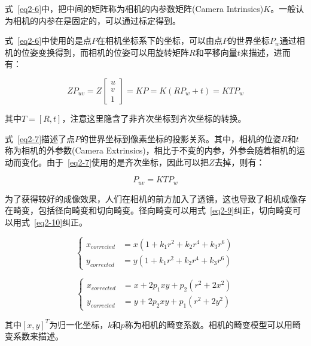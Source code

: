 式~\eqref{eq2-6}中，把中间的矩阵称为相机的内参数矩阵(Camera Intrinsics)$K$。一般认为相机的内参在是固定的，可以通过标定得到。

式~\eqref{eq2-6}中使用的是点$P$在相机坐标系下的坐标，可以由点$P$的世界坐标$P_w$通过相机的位姿变换得到，而相机的位姿可以用旋转矩阵$R$和平移向量$t$来描述，进而有：

\begin{equation}\label{eq2-7}
	Z P_{uv} = Z \left[\begin{array}{c}u \\ v \\ 1\end{array}\right] = K P = K \left(R P_w + t\right) = K T P_w
\end{equation}

其中$T=[R,t]$，注意这里隐含了非齐次坐标到齐次坐标的转换。

式~\eqref{eq2-7}描述了点$P$的世界坐标到像素坐标的投影关系。其中，相机的位姿$R$和$t$称为相机的外参数(Camera Extrinsics)，相比于不变的内参，外参会随着相机的运动而变化。由于~\eqref{eq2-7}使用的是齐次坐标，因此可以把$Z$去掉，则有：

\begin{equation}\label{eq2-8}
	P_{uv} = K T P_w
\end{equation}

为了获得较好的成像效果，人们在相机的前方加入了透镜，这也导致了相机成像存在畸变，包括径向畸变和切向畸变。径向畸变可以用式~\eqref{eq2-9}纠正，切向畸变可以用式~\eqref{eq2-10}纠正。

\begin{equation}\label{eq2-9}
	\left\{ \begin{aligned}
		x_{corrected} & = x \left( 1 + k_1 r^2 + k_2 r^4 + k_3 r^6 \right) \\
		y_{corrected} & = y \left( 1 + k_1 r^2 + k_2 r^4 + k_3 r^6 \right)
		\end{aligned}
	\right.
\end{equation}

\begin{equation}\label{eq2-10}
	\left\{ \begin{aligned}
		x_{corrected} & = x + 2 p_1 x y + p_2 \left( r^2 + 2 x^2 \right) \\
		y_{corrected} & = y + 2 p_2 x y + p_1 \left( r^2 + 2 y^2 \right) 
		\end{aligned}
	\right.
\end{equation}

其中$\left[x,y\right]^T$为归一化坐标，$k$和$p$称为相机的畸变系数。相机的畸变模型可以用畸变系数来描述。


